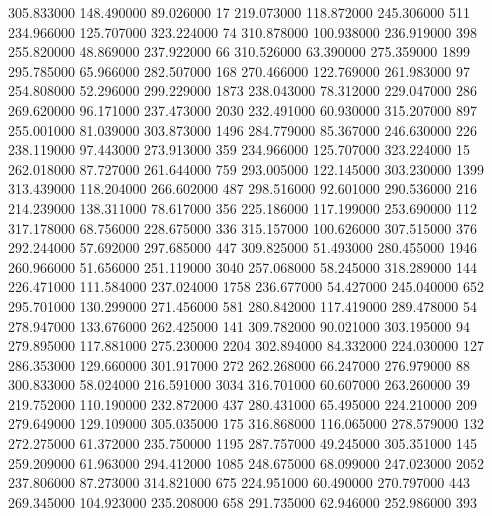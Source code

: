 305.833000	148.490000	89.026000	17
219.073000	118.872000	245.306000	511
234.966000	125.707000	323.224000	74
310.878000	100.938000	236.919000	398
255.820000	48.869000	237.922000	66
310.526000	63.390000	275.359000	1899
295.785000	65.966000	282.507000	168
270.466000	122.769000	261.983000	97
254.808000	52.296000	299.229000	1873
238.043000	78.312000	229.047000	286
269.620000	96.171000	237.473000	2030
232.491000	60.930000	315.207000	897
255.001000	81.039000	303.873000	1496
284.779000	85.367000	246.630000	226
238.119000	97.443000	273.913000	359
234.966000	125.707000	323.224000	15
262.018000	87.727000	261.644000	759
293.005000	122.145000	303.230000	1399
313.439000	118.204000	266.602000	487
298.516000	92.601000	290.536000	216
214.239000	138.311000	78.617000	356
225.186000	117.199000	253.690000	112
317.178000	68.756000	228.675000	336
315.157000	100.626000	307.515000	376
292.244000	57.692000	297.685000	447
309.825000	51.493000	280.455000	1946
260.966000	51.656000	251.119000	3040
257.068000	58.245000	318.289000	144
226.471000	111.584000	237.024000	1758
236.677000	54.427000	245.040000	652
295.701000	130.299000	271.456000	581
280.842000	117.419000	289.478000	54
278.947000	133.676000	262.425000	141
309.782000	90.021000	303.195000	94
279.895000	117.881000	275.230000	2204
302.894000	84.332000	224.030000	127
286.353000	129.660000	301.917000	272
262.268000	66.247000	276.979000	88
300.833000	58.024000	216.591000	3034
316.701000	60.607000	263.260000	39
219.752000	110.190000	232.872000	437
280.431000	65.495000	224.210000	209
279.649000	129.109000	305.035000	175
316.868000	116.065000	278.579000	132
272.275000	61.372000	235.750000	1195
287.757000	49.245000	305.351000	145
259.209000	61.963000	294.412000	1085
248.675000	68.099000	247.023000	2052
237.806000	87.273000	314.821000	675
224.951000	60.490000	270.797000	443
269.345000	104.923000	235.208000	658
291.735000	62.946000	252.986000	393
